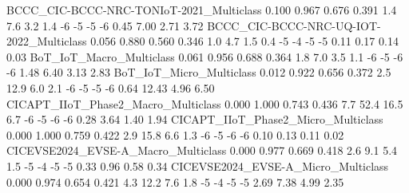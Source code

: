 BCCC_CIC-BCCC-NRC-TONIoT-2021_Multiclass                                 0.100      0.967       0.676      0.391                   1.4                   7.6                    3.2                   1.4              -6              -5               -5              -6               0.45               7.00                2.71               3.72
BCCC_CIC-BCCC-NRC-UQ-IOT-2022_Multiclass                                 0.056      0.880       0.560      0.346                   1.0                   4.7                    1.5                   0.4              -5              -4               -5              -5               0.11               0.17                0.14               0.03
BoT_IoT_Macro_Multiclass                                                 0.061      0.956       0.688      0.364                   1.8                   7.0                    3.5                   1.1              -6              -5               -6              -6               1.48               6.40                3.13               2.83
BoT_IoT_Micro_Multiclass                                                 0.012      0.922       0.656      0.372                   2.5                  12.9                    6.0                   2.1              -6              -5               -5              -6               0.64              12.43                4.96               6.50
CICAPT_IIoT_Phase2_Macro_Multiclass                                      0.000      1.000       0.743      0.436                   7.7                  52.4                   16.5                   6.7              -6              -5               -6              -6               0.28               3.64                1.40               1.94
CICAPT_IIoT_Phase2_Micro_Multiclass                                      0.000      1.000       0.759      0.422                   2.9                  15.8                    6.6                   1.3              -6              -5               -6              -6               0.10               0.13                0.11               0.02
CICEVSE2024_EVSE-A_Macro_Multiclass                                      0.000      0.977       0.669      0.418                   2.6                   9.1                    5.4                   1.5              -5              -4               -5              -5               0.33               0.96                0.58               0.34
CICEVSE2024_EVSE-A_Micro_Multiclass                                      0.000      0.974       0.654      0.421                   4.3                  12.2                    7.6                   1.8              -5              -4               -5              -5               2.69               7.38                4.99               2.35
